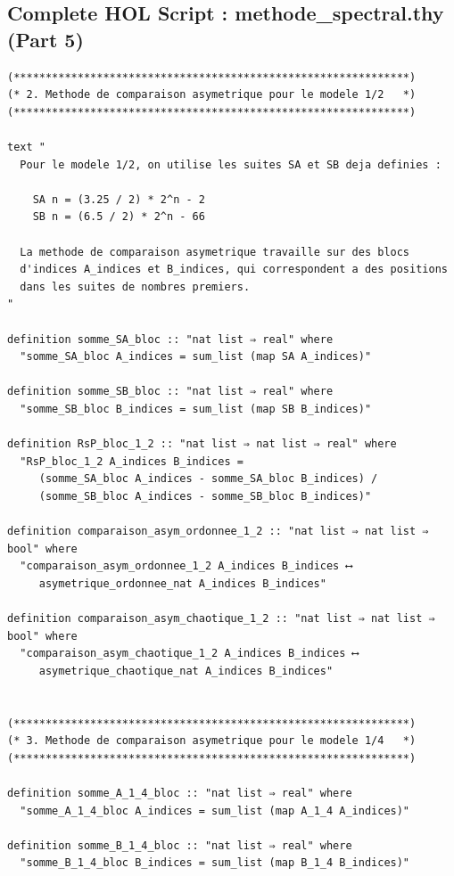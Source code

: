\documentclass[a4paper,11pt]{article}
\begin{document}
\newpage
\subsection{Complete HOL Script : methode\_spectral.thy (Part 5)}

\begin{holcode}[title={\textcolor{white}{File: methode\_spectral.thy -- Part 5/6}}]
\begin{lstlisting}
(**************************************************************)
(* 2. Methode de comparaison asymetrique pour le modele 1/2   *)
(**************************************************************)

text "
  Pour le modele 1/2, on utilise les suites SA et SB deja definies :

    SA n = (3.25 / 2) * 2^n - 2
    SB n = (6.5 / 2) * 2^n - 66

  La methode de comparaison asymetrique travaille sur des blocs
  d'indices A_indices et B_indices, qui correspondent a des positions
  dans les suites de nombres premiers.
"

definition somme_SA_bloc :: "nat list ⇒ real" where
  "somme_SA_bloc A_indices = sum_list (map SA A_indices)"

definition somme_SB_bloc :: "nat list ⇒ real" where
  "somme_SB_bloc B_indices = sum_list (map SB B_indices)"

definition RsP_bloc_1_2 :: "nat list ⇒ nat list ⇒ real" where
  "RsP_bloc_1_2 A_indices B_indices =
     (somme_SA_bloc A_indices - somme_SA_bloc B_indices) /
     (somme_SB_bloc A_indices - somme_SB_bloc B_indices)"

definition comparaison_asym_ordonnee_1_2 :: "nat list ⇒ nat list ⇒ bool" where
  "comparaison_asym_ordonnee_1_2 A_indices B_indices ⟷
     asymetrique_ordonnee_nat A_indices B_indices"

definition comparaison_asym_chaotique_1_2 :: "nat list ⇒ nat list ⇒ bool" where
  "comparaison_asym_chaotique_1_2 A_indices B_indices ⟷
     asymetrique_chaotique_nat A_indices B_indices"


(**************************************************************)
(* 3. Methode de comparaison asymetrique pour le modele 1/4   *)
(**************************************************************)

definition somme_A_1_4_bloc :: "nat list ⇒ real" where
  "somme_A_1_4_bloc A_indices = sum_list (map A_1_4 A_indices)"

definition somme_B_1_4_bloc :: "nat list ⇒ real" where
  "somme_B_1_4_bloc B_indices = sum_list (map B_1_4 B_indices)"


\end{lstlisting}
\end{holcode}
\end{document}
